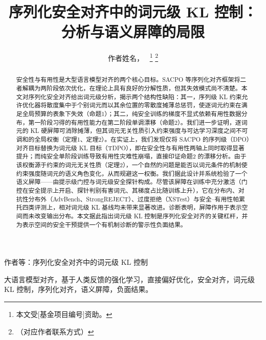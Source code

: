 \documentclass[lettersize,journal]{IEEEtran}
\begin{document}
\title{序列化安全对齐中的词元级 KL 控制：分析与语义屏障的局限}

\author{作者姓名，~
\thanks{本文受[基金项目编号]资助。}%
\thanks{（对应作者联系方式）}}

%
{作者等：序列化安全对齐中的词元级 KL 控制}

\IEEEpubid{}

\maketitle

\begin{abstract}
安全性与有用性是大型语言模型对齐的两个核心目标。SACPO 等序列化对齐框架将二者解耦为两阶段依次优化，在理论上具有良好的分解性质，但其失效模式尚不清楚。本文对序列化安全对齐给出词元级分析，揭示两个结构性缺陷：其一，序列级 KL 约束允许优化器将散度集中于个别词元而以其余位置的零散度摊薄总惩罚，使逐词元约束在满足全局预算的表象下失效（命题1）；其二，纯安全训练的梯度不显式依赖有用性数据分布，第一阶段习得的有用性能力在第二阶段单调漂移（命题2）。我们进一步证明，逐词元的 KL 硬屏障可消除摊薄，但其词元无关性质引入约束强度与可达学习深度之间不可调和的全局权衡（定理1、定理2）。在实证上，我们发现仅将 SACPO 的序列级（DPO）对齐目标替换为词元级 KL 目标（TDPO），即在安全性与有用性两轴上同时取得显著提升；而纯安全单阶段训练导致有用性灾难性崩塌，直接印证命题2 的漂移分析。由于该权衡源于约束的词元无关性质（定理2），一个自然的问题是能否以词元条件的机制使约束强度随词元的语义角色变化，从而规避这一权衡。我们据此设计并系统检验了一个语义屏障——由提示级门控与词元级安全探针构成。尽管该屏障在训练中充分激活（门控在安全提示上开启、探针判别有害词元、其梯度占比随训练上升），它在分布内、对抗性分布外（AdvBench、StrongREJECT）、过度拒绝（XSTest）与安全–有用性帕累托四类评测上，相对词元级 KL 基线均未带来显著改进。诊断表明，屏障作用于表示空间而未改变输出分布。本文据此指出词元级 KL 控制是序列化安全对齐的关键杠杆，并为表示空间的安全干预提供一个有机制诊断的警示性负面结果。
\end{abstract}


\begin{IEEEkeywords}
大语言模型对齐，基于人类反馈的强化学习，直接偏好优化，安全对齐，词元级 KL 控制，序列化对齐，语义屏障，负面结果。
\end{IEEEkeywords}
\end{document}
